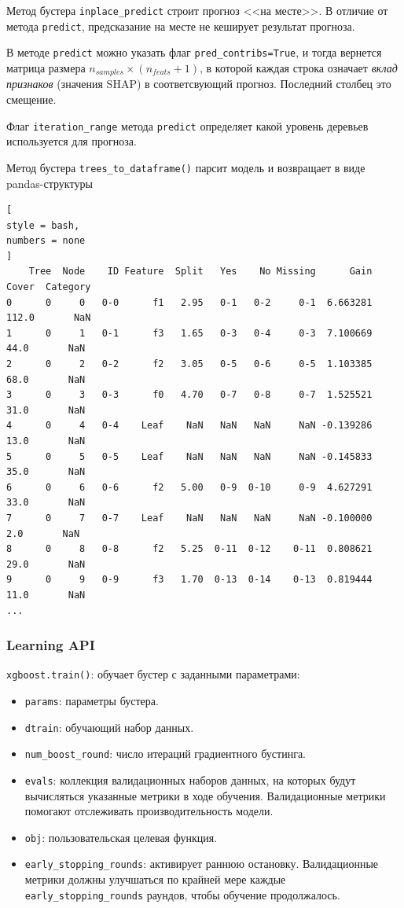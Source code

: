 \documentclass[%
	11pt,
	a4paper,
	utf8,
		]{article}
\begin{document}
Метод бустера \verb|inplace_predict| строит прогноз <<на месте>>. В отличие от метода \verb|predict|, предсказание на месте не кеширует результат прогноза.

В методе \verb|predict| можно указать флаг \verb|pred_contribs=True|, и тогда вернется матрица размера $ n_{samples} \times (n_{feats} + 1) $, в которой каждая строка означает \emph{вклад признаков} (значения SHAP) в соответсвующий прогноз. Последний столбец это смещение.

Флаг \verb|iteration_range| метода \verb|predict| определяет какой уровень деревьев используется для прогноза.

Метод бустера \verb|trees_to_dataframe()| парсит модель и возвращает в виде pandas-структуры
\begin{lstlisting}[
style = bash,
numbers = none
]
    Tree  Node    ID Feature  Split   Yes    No Missing      Gain  Cover  Category
0      0     0   0-0      f1   2.95   0-1   0-2     0-1  6.663281  112.0       NaN
1      0     1   0-1      f3   1.65   0-3   0-4     0-3  7.100669   44.0       NaN
2      0     2   0-2      f2   3.05   0-5   0-6     0-5  1.103385   68.0       NaN
3      0     3   0-3      f0   4.70   0-7   0-8     0-7  1.525521   31.0       NaN
4      0     4   0-4    Leaf    NaN   NaN   NaN     NaN -0.139286   13.0       NaN
5      0     5   0-5    Leaf    NaN   NaN   NaN     NaN -0.145833   35.0       NaN
6      0     6   0-6      f2   5.00   0-9  0-10     0-9  4.627291   33.0       NaN
7      0     7   0-7    Leaf    NaN   NaN   NaN     NaN -0.100000    2.0       NaN
8      0     8   0-8      f2   5.25  0-11  0-12    0-11  0.808621   29.0       NaN
9      0     9   0-9      f3   1.70  0-13  0-14    0-13  0.819444   11.0       NaN
...
\end{lstlisting}

\subsubsection{Learning API}

\verb|xgboost.train()|: обучает бустер с заданными параметрами:
\begin{itemize}
	\item \verb|params|: параметры бустера.
	
	\item \verb|dtrain|: обучающий набор данных.
	
	\item \verb|num_boost_round|: число итераций градиентного бустинга.
	
	\item \verb|evals|: коллекция валидационных наборов данных, на которых будут вычисляться указанные метрики в ходе обучения. Валидационные метрики помогают отслеживать производительность модели.
	
	\item \verb|obj|: пользовательская целевая функция.
	
	\item \verb|early_stopping_rounds|: активирует раннюю остановку. Валидационные метрики должны улучшаться по крайней мере каждые \verb|early_stopping_rounds| раундов, чтобы обучение продолжалось. 
\end{itemize}
\end{document}

